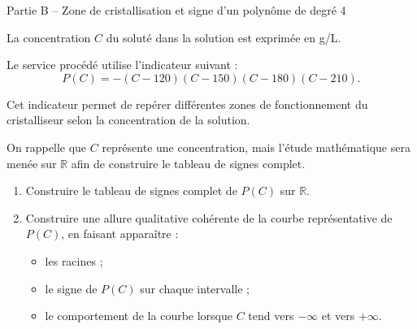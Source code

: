 \documentclass[10pt,a4paper]{article}
\begin{document}
	\begin{partbox}{Partie B -- Zone de cristallisation et signe d'un polynôme de degré 4}
		
		La concentration $C$ du soluté dans la solution est exprimée en g/L.
		
		Le service procédé utilise l'indicateur suivant :
		\[
		P(C)=-(C-120)(C-150)(C-180)(C-210).
		\]
		
		Cet indicateur permet de repérer différentes zones de fonctionnement du cristalliseur selon la concentration de la solution.
		
		\begin{databox}
			On rappelle que $C$ représente une concentration, mais l'étude mathématique sera menée sur $\mathbb{R}$ afin de construire le tableau de signes complet.
		\end{databox}
		
		\begin{enumerate}
			\item Construire le tableau de signes complet de $P(C)$ sur $\mathbb{R}$.
			
			\item Construire une allure qualitative cohérente de la courbe représentative de $P(C)$, en faisant apparaître :
			\begin{itemize}
				\item les racines ;
				\item le signe de $P(C)$ sur chaque intervalle ;
				\item le comportement de la courbe lorsque $C$ tend vers $-\infty$ et vers $+\infty$.
			\end{itemize}
		\end{enumerate}
		
	\end{partbox}
	
\end{document}
